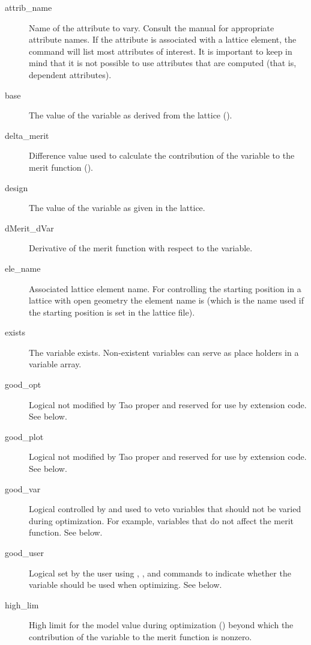   \begin{description}
  \item[attrib_name] \Newline
Name of the attribute to vary. Consult the \bmad manual for appropriate attribute names. If the
attribute is associated with a lattice element, the  command will list most
attributes of interest.  It is important to keep in mind that it is not possible to use attributes
that are computed (that is, dependent attributes).
  \item[base] \Newline
The value of the variable as derived from the  lattice ().
  \item[delta_merit] \Newline
Difference value used to calculate the contribution of the variable to the merit function ().
  \item[design] \Newline
The value of the variable as given in the  lattice.
  \item[dMerit_dVar] \Newline
Derivative of the merit function with respect to the variable.
  \item[ele_name] \Newline
Associated lattice element name. For controlling the starting position in a lattice with open
geometry the element name is  (which is the name used if the starting position is
set in the lattice file). 
  \item[exists] \Newline
The variable exists. Non-existent variables can serve as place holders in a variable
array.
  \item[good_opt] \Newline
Logical not modified by Tao proper and reserved for use by extension code. See below.
  \item[good_plot] \Newline
Logical not modified by Tao proper and reserved for use by extension code. See below.
  \item[good_var] \Newline
Logical controlled by \tao and used to veto variables that should not be varied during
optimization. For example, variables that do not affect the merit function. See below.
  \item[good_user] \Newline
Logical set by the user using , , and  commands to indicate
whether the variable should be used when optimizing. See below.
  \item[high_lim] \Newline
High limit for the model value during optimization () beyond which
the contribution of the variable to the merit function is nonzero.

\end{description}
